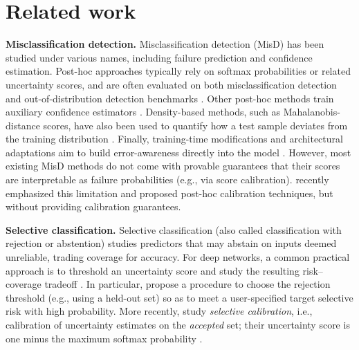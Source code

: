 \documentclass{article}
\theoremstyle{plain}
\theoremstyle{definition}
\theoremstyle{remark}
\begin{document}
\section{Related work}
\label{sec:related_work}

\textbf{Misclassification detection.}
Misclassification detection (MisD) has been studied under various names, including failure prediction and confidence estimation.
Post-hoc approaches typically rely on softmax probabilities or related uncertainty scores, and are often evaluated on both misclassification detection and out-of-distribution detection benchmarks
\citep{hendrycks2018baselinedetectingmisclassifiedoutofdistribution, granese2021doctorsimplemethoddetecting, dadalto2024datadrivenmeasurerelativeuncertainty, gudovskiy2023flowenedet}.
Other post-hoc methods train auxiliary confidence estimators
\citep{jiang_trust, moon2020confidenceawarelearningdeepneural, fisch2022calibrated, zhu2023openmixexploringoutliersamples, NEURIPS2019_757f843a}.
Density-based methods, such as Mahalanobis-distance scores, have also been used to quantify how a test sample deviates from the training distribution
\citep{vazhentsev_uncertainty_2022}.
Finally, training-time modifications and architectural adaptations aim to build error-awareness directly into the model
\citep{corbière2019addressingfailurepredictionlearning, corbière2021confidenceestimationauxiliarymodels, luo2021learningpredicttrustworthinesssteep, huang2020selfadaptivetrainingempiricalrisk, yan2025ratboostingmisclassificationdetection, zhu2024revisitingconfidenceestimationreliable}.
However, most existing MisD methods do not come with provable guarantees that their scores are interpretable as failure probabilities (e.g., via score calibration).
\citet{vashurin_benchmarking_2025} recently emphasized this limitation and proposed post-hoc calibration techniques, but without providing calibration guarantees.






\textbf{Selective classification.}
Selective classification (also called classification with rejection or abstention) studies predictors that may abstain on
inputs deemed unreliable, trading coverage for accuracy.
For deep networks, a common practical approach is to threshold an uncertainty score and study the resulting
risk--coverage tradeoff \citep{geifman2017selectiveclassificationdeepneural, geifman2019selectivenetdeepneuralnetwork}.
In particular, \citet{geifman2017selectiveclassificationdeepneural} propose a procedure to choose the rejection threshold
(e.g., using a held-out set) so as to meet a user-specified target selective risk with high probability.
More recently, \citet{fisch2022calibrated} study \emph{selective calibration}, i.e., calibration of uncertainty estimates on the
\emph{accepted} set; their uncertainty score is one minus the maximum softmax probability \citep{hendrycks2018baselinedetectingmisclassifiedoutofdistribution}.
\end{document}
